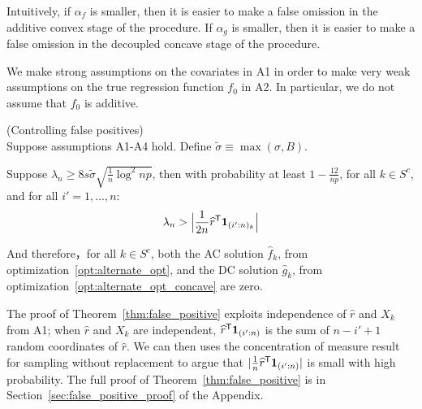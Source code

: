 Intuitively, if $\alpha_f$ is smaller, then it is easier to make a false omission in the additive convex stage of the procedure. If $\alpha_g$ is smaller, then it is easier to make a false omission in the decoupled concave stage of the procedure.

\begin{remark}
  We make strong assumptions on the covariates in A1 in order to make
  very weak assumptions on the true regression function $f_0$ in
  A2. In particular, we do not assume that $f_0$ is additive. 
\end{remark}


\begin{theorem} (Controlling false positives) \\
\label{thm:false_positive}
Suppose assumptions A1-A4 hold. Define $\tilde{\sigma} \equiv \max(\sigma, B)$.

Suppose $\lambda_n \geq 8 s \tilde{\sigma}  \sqrt{ \frac{1}{n} \log^2 np}$, then with probability at least $ 1 - \frac{12}{np}$, for all $k \in S^c$, and for all $i'=1,...,n$:
\[
\lambda_n > \Big| \frac{1}{2n}\widehat{r}^{\mathsf{T}} \mbox{\boldmath $1$}_{(i':n)_k} \Big|
\]

And therefore，for all $k \in S^c$, both the AC solution $\hat{f}_k$, from optimization~\eqref{opt:alternate_opt}, and the DC solution $\hat{g}_k$, from optimization~\eqref{opt:alternate_opt_concave} are zero. 
\end{theorem}

The proof of Theorem~\ref{thm:false_positive} exploits independence of
$\hat{r}$ and $X_k$ from A1; when $\hat{r}$ and $X_k$ are independent, $\widehat{r}^{\mathsf{T}} \mbox{\boldmath $1$}_{(i':n)}$ is the sum of $n - i' +1$ random coordinates of $\hat{r}$.  We can then uses the concentration of measure result for sampling without replacement to argue that $| \frac{1}{n} \widehat{r}^{\mathsf{T}}\mbox{\boldmath $1$}_{(i':n)}|$ is small with high probability. The full proof of
Theorem~\ref{thm:false_positive} is in
Section~\ref{sec:false_positive_proof} of the Appendix.


